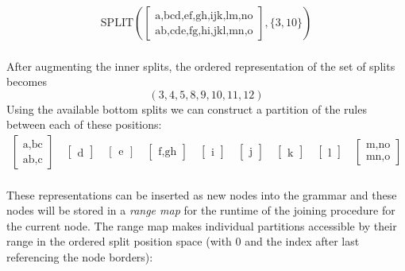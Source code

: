 {
\ttfamily
\begin{align*}
    \text{SPLIT}\left(
    \begin{bmatrix}
        \text{a,bcd,ef,gh,ijk,lm,no}\\
        \text{ab,cde,fg,hi,jkl,mn,o}
    \end{bmatrix}
    , \{3, 10\}
    \right)
\end{align*}
}\\
%
After augmenting the inner splits, the ordered representation of the set of splits becomes
\[
    (3, 4, 5, 8, 9, 10, 11, 12)
\]
Using the available bottom splits we can construct a partition of the rules between each of these positions:
%
{
    \ttfamily
    \noindent
    \begin{align*}
        \begin{bmatrix}
            \text{a,bc}\\
            \text{ab,c}
        \end{bmatrix}
        \quad
        \begin{bmatrix}
            \text{d}
        \end{bmatrix}
        \quad
        \begin{bmatrix}
            \text{e}
        \end{bmatrix}
        \quad
        \begin{bmatrix}
            \text{f,gh}
        \end{bmatrix}
        \quad
        \begin{bmatrix}
            \text{i}
        \end{bmatrix}
        \quad
        \begin{bmatrix}
            \text{j}
        \end{bmatrix}
        \quad
        \begin{bmatrix}
            \text{k}
        \end{bmatrix}
        \quad
        \begin{bmatrix}
            \text{l}
        \end{bmatrix}
        \quad
        \begin{bmatrix}
            \text{m,no}\\
            \text{mn,o}
        \end{bmatrix}
    \end{align*}
}\\
%
These representations can be inserted as new nodes into the grammar and these nodes will be stored in a \emph{range map} for the runtime of the joining procedure for the current node. The range map makes individual partitions accessible by their range in the ordered split position space (with $0$ and the index after last referencing the node borders):
